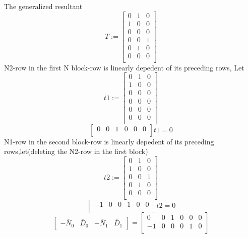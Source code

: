 \documentclass{article}
\begin{document}
The generalized resultant
\[
T:=\left[
    \begin{array}{ccc}
        0 & 1 & 0\\
        1 & 0 & 0\\
        0 & 0 & 0\\
        0 & 0 & 1\\
        0 & 1 & 0\\
        0 & 0 & 0\\
    \end{array}
\right]    
\]
N2-row in the first N block-row is linearly depedent of its preceding rows,
Let 
\[
t1:=\left[
    \begin{array}{ccc}
        0 & 1 & 0\\
        1 & 0 & 0\\
        0 & 0 & 0\\
        0 & 0 & 0\\
        0 & 0 & 0\\
        0 & 0 & 0\\
    \end{array}
\right]    
\]
\[
    \left[
        \begin{array}{cccccc}
            0 & 0 & 1 & 0 & 0 &0\\
        \end{array}
    \right]t1=0    
\]
N1-row in the second block-row is linearly depedent of its preceding rows,let(deleting the N2-row in the first block)
\[
t2:=\left[
    \begin{array}{ccc}
        0 & 1 & 0\\
        1 & 0 & 0\\
        0 & 0 & 1\\
        0 & 1 & 0\\
        0 & 0 & 0\\
    \end{array}
\right]
\]  
\[
    \left[
        \begin{array}{cccccc}
            -1 & 0 & 0 & 1 & 0 &0\\
        \end{array}
    \right]t2=0    
\]
\[
\left[
    \begin{array}{cccc}
        -\overline{N}_0 & \overline{D}_0 & -\overline{N}_1 & \overline{D}_1
    \end{array}
\right]=
\left[
    \begin{array}{cccccc}
        0 & 0 & 1 & 0 & 0 &0\\
        -1 & 0 & 0 & 0 & 1 &0\\
    \end{array}
\right]
\]
\end{document}
